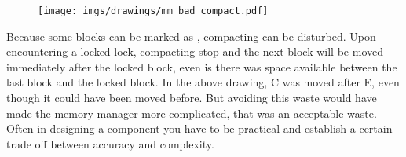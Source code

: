 \documentclass[book.tex]{subfiles}
\begin{document}
   \par
\begin{figure}[H]
\centering
 \texttt{[image: imgs/drawings/mm\_bad\_compact.pdf]}
 \end{figure}
 \par
 Because some blocks can be marked as , compacting can be disturbed. Upon encountering a locked lock, compacting stop and the next block will be moved immediately after the locked block, even is there was space available between the last block and the locked block. In the above drawing, C was moved after E, even though it could have been moved before. But avoiding this waste would have made the memory manager more complicated, that was an acceptable waste. Often in designing a component you have to be practical and establish a certain trade off between accuracy and complexity.
\end{document}
